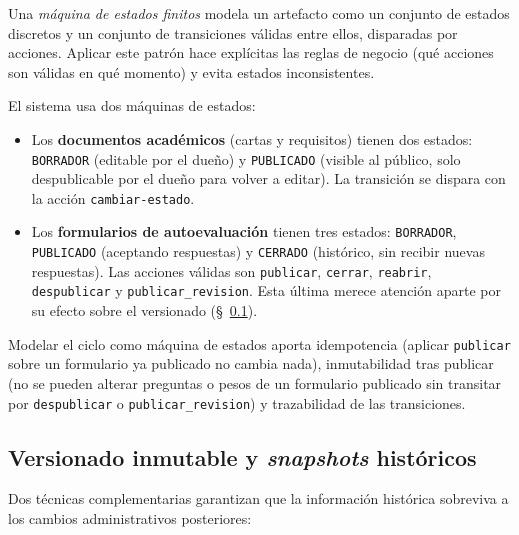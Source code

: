 Una \emph{máquina de estados finitos} modela un artefacto como un conjunto de estados discretos y un conjunto de transiciones válidas entre ellos, disparadas por acciones. Aplicar este patrón hace explícitas las reglas de negocio (qué acciones son válidas en qué momento) y evita estados inconsistentes.

El sistema usa dos máquinas de estados:

\begin{itemize}
    \item Los \textbf{documentos académicos} (cartas y requisitos) tienen dos estados: \texttt{BORRADOR} (editable por el dueño) y \texttt{PUBLICADO} (visible al público, solo despublicable por el dueño para volver a editar). La transición se dispara con la acción \texttt{cambiar-estado}.
    \item Los \textbf{formularios de autoevaluación} tienen tres estados: \texttt{BORRADOR}, \texttt{PUBLICADO} (aceptando respuestas) y \texttt{CERRADO} (histórico, sin recibir nuevas respuestas). Las acciones válidas son \texttt{publicar}, \texttt{cerrar}, \texttt{reabrir}, \texttt{despublicar} y \texttt{publicar\_revision}. Esta última merece atención aparte por su efecto sobre el versionado (\S~\ref{subsec:versionado}).
\end{itemize}

Modelar el ciclo como máquina de estados aporta idempotencia (aplicar \texttt{publicar} sobre un formulario ya publicado no cambia nada), inmutabilidad tras publicar (no se pueden alterar preguntas o pesos de un formulario publicado sin transitar por \texttt{despublicar} o \texttt{publicar\_revision}) y trazabilidad de las transiciones.

\subsection{Versionado inmutable y \emph{snapshots} históricos}\label{subsec:versionado}

Dos técnicas complementarias garantizan que la información histórica sobreviva a los cambios administrativos posteriores:

